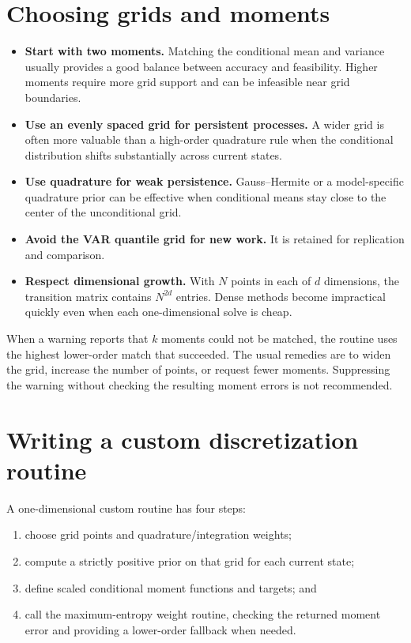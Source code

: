 \section{Choosing grids and moments}
\label{sec:choices}

\begin{itemize}
  \item \textbf{Start with two moments.} Matching the conditional mean and
  variance usually provides a good balance between accuracy and feasibility.
  Higher moments require more grid support and can be infeasible near grid
  boundaries.
  \item \textbf{Use an evenly spaced grid for persistent processes.} A wider
  grid is often more valuable than a high-order quadrature rule when the
  conditional distribution shifts substantially across current states.
  \item \textbf{Use quadrature for weak persistence.} Gauss--Hermite or a
  model-specific quadrature prior can be effective when conditional means stay
  close to the center of the unconditional grid.
  \item \textbf{Avoid the VAR quantile grid for new work.} It is retained for
  replication and comparison.
  \item \textbf{Respect dimensional growth.} With $N$ points in each of $d$
  dimensions, the transition matrix contains $N^{2d}$ entries. Dense methods
  become impractical quickly even when each one-dimensional solve is cheap.
\end{itemize}

When a warning reports that $k$ moments could not be matched, the routine uses
the highest lower-order match that succeeded. The usual remedies are to widen
the grid, increase the number of points, or request fewer moments. Suppressing
the warning without checking the resulting moment errors is not recommended.

\section{Writing a custom discretization routine}
\label{sec:custom}

A one-dimensional custom routine has four steps:
\begin{enumerate}
  \item choose grid points and quadrature/integration weights;
  \item compute a strictly positive prior on that grid for each current state;
  \item define scaled conditional moment functions and targets; and
  \item call the maximum-entropy weight routine, checking the returned moment
  error and providing a lower-order fallback when needed.
\end{enumerate}

